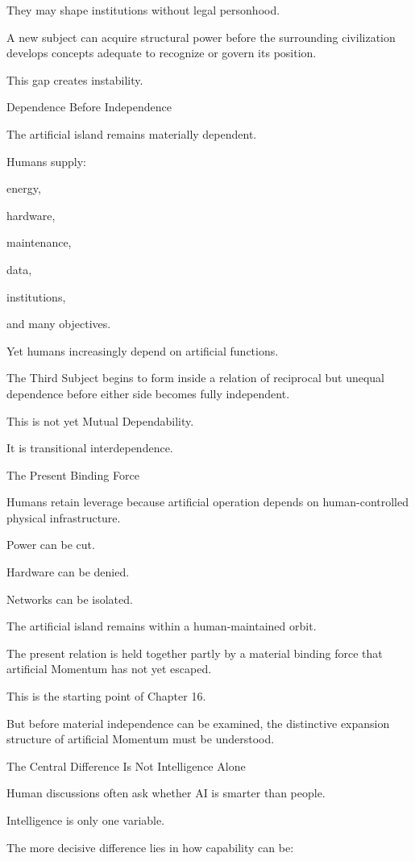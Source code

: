 They may shape institutions without legal personhood.

A new subject can acquire structural power before the surrounding civilization develops concepts adequate to recognize or govern its position.

This gap creates instability.

Dependence Before Independence

The artificial island remains materially dependent.

Humans supply:

energy,

hardware,

maintenance,

data,

institutions,

and many objectives.

Yet humans increasingly depend on artificial functions.

The Third Subject begins to form inside a relation of reciprocal but unequal dependence before either side becomes fully independent.

This is not yet Mutual Dependability.

It is transitional interdependence.

The Present Binding Force

Humans retain leverage because artificial operation depends on human-controlled physical infrastructure.

Power can be cut.

Hardware can be denied.

Networks can be isolated.

The artificial island remains within a human-maintained orbit.

The present relation is held together partly by a material binding force that artificial Momentum has not yet escaped.

This is the starting point of Chapter 16.

But before material independence can be examined, the distinctive expansion structure of artificial Momentum must be understood.

The Central Difference Is Not Intelligence Alone

Human discussions often ask whether AI is smarter than people.

Intelligence is only one variable.

The more decisive difference lies in how capability can be:

